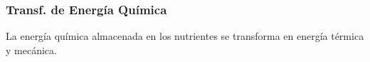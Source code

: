 \documentclass[14pt]{beamer}
\begin{document}
\begin{frame}
\frametitle{Transf. de Energía Química}
La energía química almacenada en los nutrientes se transforma en energía térmica y mecánica.
\end{frame}
\end{document}
